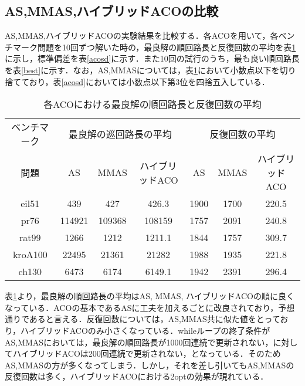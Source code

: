 \documentclass[a4j]{jsarticle}
\begin{document}
\subsection{AS,MMAS,ハイブリッドACOの比較}
AS,MMAS,ハイブリッドACOの実験結果を比較する．各ACOを用いて，各ベンチマーク問題を10回ずつ解いた時の，最良解の順回路長と反復回数の平均を表\ref{acoave}に示し，標準偏差を表\ref{acosd}に示す．また10回の試行のうち，最も良い順回路長を表\ref{best}に示す．なお，AS,MMASについては，表\ref{acoave}において小数点以下を切り捨てており，表\ref{acosd}においては小数点以下第3位を四捨五入している．
\begin{table}[htb]
 \begin{center}
  \caption{各ACOにおける最良解の順回路長と反復回数の平均}
  \label{acoave}
  \begin{tabular}[tb]{|c||c|c|c||c|c|c|} \hline
 ベンチマーク& \multicolumn{3}{|c||}{最良解の巡回路長の平均}& \multicolumn{3}{|c|}{反復回数の平均} \\\cline{2-7}
 問題 & AS & MMAS & ハイブリッドACO & AS & MMAS & ハイブリッドACO \\\hline
eil51 & 439 & 427 & 426.3 & 1900 & 1700 & 220.5 \\\hline
pr76 & 114921 & 109368 & 108159 & 1757 & 2091 & 240.8 \\\hline
rat99 & 1266 & 1212 & 1211.1 & 1844 & 1757 & 309.7 \\\hline
kroA100 & 22495 & 21361 & 21282 & 1988 & 1935 & 221.8 \\\hline
ch130 & 6473 & 6174 & 6149.1 & 1942 & 2391 & 296.4 \\\hline
  \end{tabular}
 \end{center}
\end{table}
\par
表\ref{acoave}より，最良解の順回路長の平均はAS, MMAS, ハイブリッドACOの順に良くなっている．ACOの基本であるASに工夫を加えるごとに改良されており，予想通りであると言える．反復回数については，AS,MMAS共に似た値をとっており，ハイブリッドACOのみ小さくなっている．whileループの終了条件がAS,MMASにおいては，最良解の順回路長が1000回連続で更新されない，に対してハイブリッドACOは200回連続で更新されない，となっている．そのためAS,MMASの方が多くなってしまう．しかし，それを差し引いてもAS,MMASの反復回数は多く，ハイブリッドACOにおける2optの効果が現れている．
\end{document}
